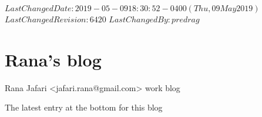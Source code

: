 {$LastChangedDate: 2019-05-09 18:30:52 -0400 (Thu, 09 May 2019) $}
{$LastChangedRevision: 6420 $} {$LastChangedBy: predrag $}

\chapter{Rana's blog}
\label{chap:blogRJ}

\bigskip

\hfill   {\large Rana Jafari <jafari.rana@gmail.com> work blog}

\hfill   {\color{red} The latest entry at the bottom for this blog}

\bigskip

